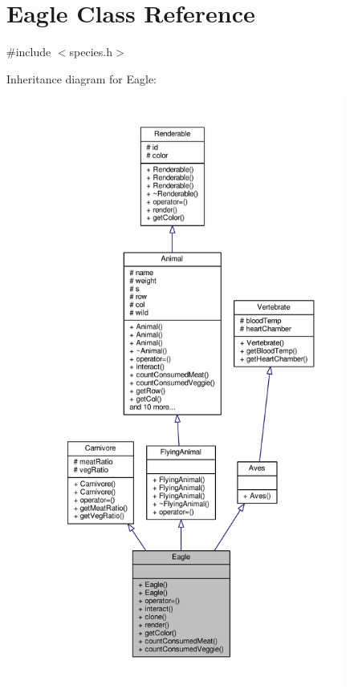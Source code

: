 \hypertarget{classEagle}{}\section{Eagle Class Reference}
\label{classEagle}


{\ttfamily \#include $<$species.\+h$>$}



Inheritance diagram for Eagle\+:
\nopagebreak
\begin{figure}[H]
\begin{center}
\leavevmode
\includegraphics[height=550pt]{classEagle__inherit__graph}
\end{center}
\end{figure}


